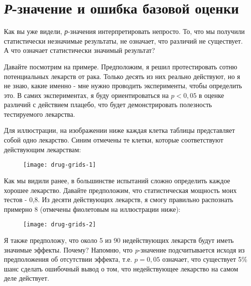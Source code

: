\chapter[Ошибка базовой оценки]{\emph{Р}-значение и ошибка базовой оценки}
\label{chp5}

Как вы уже видели, \emph{р}-значения интерпретировать непросто. То, что мы получили статистически незначимые результаты, не означает, что различий не существует. А что означает статистически значимый результат?

Давайте посмотрим на примере. Предположим, я решил протестировать сотню потенциальных лекарств от рака. Только десять из них реально действуют, но я не знаю, какие именно - мне нужно проводить эксперименты, чтобы определить это. В самих экспериментах, я буду ориентироваться на $p<0,05$ в оценке различий с действием плацебо, что будет демонстрировать полезность тестируемого лекарства. 

Для иллюстрации, на изображении ниже каждая клетка таблицы представляет собой одно лекарство. Синим отмечены те клетки, которые соответствуют действующим лекарствам:



\begin{figure}[h!]
    \centering
    \texttt{[image: drug-grids-1]}
    \label{fig5:drug-grid-1}
\end{figure}

Как мы видили ранее, в большинстве испытаний сложно определить каждое хорошее лекарство. Давайте предположим, что статистическая мощность моих тестов - 0,8. Из десяти действующих лекарств, я смогу правильно распознать примерно 8 (отмечены фиолетовым на иллюстрации ниже):

\newpage %

\begin{figure}[h!]
    \centering
    \texttt{[image: drug-grids-2]}
    \label{fig5:drug-grid-2}
\end{figure}


Я также предположу, что около 5 из 90 недействующих лекарств будут иметь значимые эффекты. Почему? Напомню, что \emph{p}-значение подсчитывается исходя из предположения об отсутствии эффекта, т.е. $ p =0,05$ означает, что существует 5\% шанс сделать ошибочный вывод о том, что недействующее лекарство на самом деле действует.

